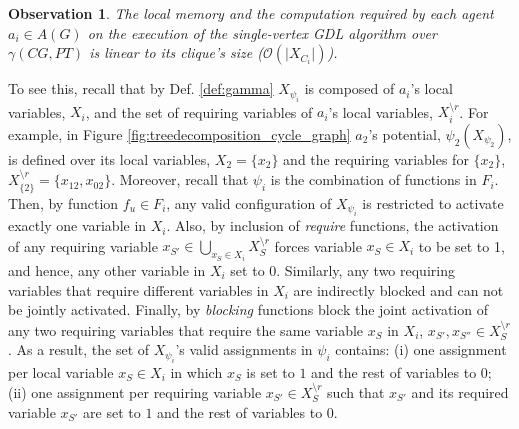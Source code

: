 \documentclass{aamas2012}
\newtheorem{observation}{Observation}
\begin{document}
\begin{observation}
The local memory and the computation required by each agent $a_i\in A(G)$ on the
execution of the single-vertex GDL algorithm over $\gamma(CG,PT)$ is linear to
its clique's size ($\mathcal{O}(\vert X_{C_i}\vert)$).
\label{obs:complexity_on_trees}
\vspace{-0.1in}
\end{observation}
To see this, recall that by Def. \ref{def:gamma} $X_{\psi_i}$ is composed of $a_i$'s local
variables, $X_i$, and the set of requiring variables of $a_i$'s local variables,
$X^{\setminus r}_i$. 
For example, in Figure \ref{fig:treedecomposition_cycle_graph} $a_2$'s
potential, $\psi_2(X_{\psi_2})$, is defined over its local variables,
$X_2=\{x_2\}$ and the requiring variables for $\{x_2\}$, $X^{\setminus r}_{\{2\}}= \{x_{12},x_{02}\}$. Moreover, recall that $\psi_i$ is the
combination of functions in $F_i$.
 Then, by function $f_u\in F_i$, any valid
configuration of $X_{\psi_i}$ is restricted to activate exactly one
variable in $X_i$. Also, by inclusion of \emph{require} functions,
the activation of any requiring variable $x_{S'}\in \bigcup_{x_S\in X_i}
X^{\setminus r}_S$ forces variable $x_S\in X_i$ to be set to 1, and hence,
any other variable in $X_i$ set to 0. Similarly, any two requiring variables
that require different variables in $X_i$ are indirectly blocked and can not be
jointly activated. Finally, by \emph{blocking}
functions block the joint activation of any two requiring variables that require
the same variable $x_S$ in $X_i$, $x_{S'},x_{S''}\in X^{\setminus r}_S$.
As a result, the set of $X_{\psi_i}$'s valid assignments in
$\psi_i$ contains: (i) one assignment per local variable $x_S \in X_i$ in which
$x_S$ is set to $1$ and the rest of variables to $0$; (ii) one
assignment per requiring variable $x_{S'} \in X^{\setminus r}_S$ such that $x_{S'}$ and its required variable $x_{S'}$ are set to $1$ and the rest of variables to $0$.
\end{document}
